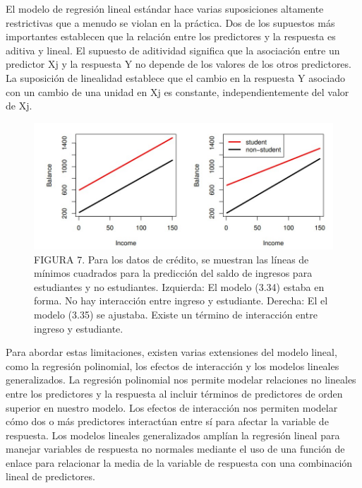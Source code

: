 \documentclass[
  letterpaper,
  DIV=11,
  numbers=noendperiod]{scrartcl}
\begin{document}
El modelo de regresión lineal estándar hace varias suposiciones
altamente restrictivas que a menudo se violan en la práctica. Dos de los
supuestos más importantes establecen que la relación entre los
predictores y la respuesta es aditiva y lineal. El supuesto de
aditividad significa que la asociación entre un predictor Xj y la
respuesta Y no depende de los valores de los otros predictores. La
suposición de linealidad establece que el cambio en la respuesta Y
asociado con un cambio de una unidad en Xj es constante,
independientemente del valor de Xj.

\begin{figure}

{\centering \includegraphics{images/dsads.jpg}

}

\caption{FIGURA 7. Para los datos de crédito, se muestran las líneas de
mínimos cuadrados para la predicción del saldo de ingresos para
estudiantes y no estudiantes. Izquierda: El modelo (3.34) estaba en
forma. No hay interacción entre ingreso y estudiante. Derecha: El el
modelo (3.35) se ajustaba. Existe un término de interacción entre
ingreso y estudiante.}

\end{figure}

Para abordar estas limitaciones, existen varias extensiones del modelo
lineal, como la regresión polinomial, los efectos de interacción y los
modelos lineales generalizados. La regresión polinomial nos permite
modelar relaciones no lineales entre los predictores y la respuesta al
incluir términos de predictores de orden superior en nuestro modelo. Los
efectos de interacción nos permiten modelar cómo dos o más predictores
interactúan entre sí para afectar la variable de respuesta. Los modelos
lineales generalizados amplían la regresión lineal para manejar
variables de respuesta no normales mediante el uso de una función de
enlace para relacionar la media de la variable de respuesta con una
combinación lineal de predictores.
\end{document}
